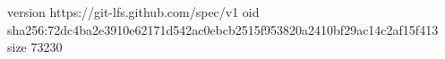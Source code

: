 version https://git-lfs.github.com/spec/v1
oid sha256:72dc4ba2e3910e62171d542ac0ebcb2515f953820a2410bf29ac14c2af15f413
size 73230
